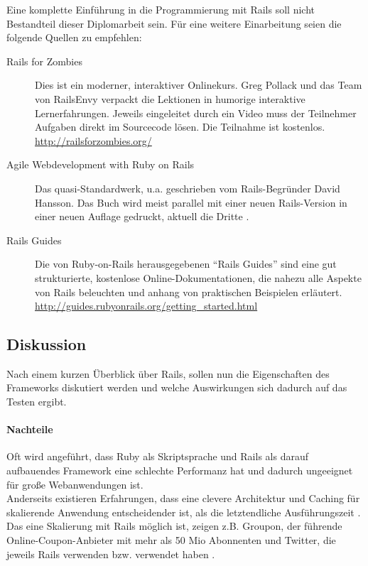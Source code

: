 Eine komplette Einführung in die Programmierung mit Rails soll nicht Bestandteil dieser Diplomarbeit sein. Für eine weitere Einarbeitung seien die folgende Quellen zu empfehlen:
\begin{description}
 \item[Rails for Zombies] Dies ist ein moderner, interaktiver Onlinekurs. Greg Pollack und das Team von RailsEnvy verpackt die Lektionen in humorige interaktive Lernerfahrungen. Jeweils eingeleitet durch ein Video muss der Teilnehmer Aufgaben direkt im Sourcecode lösen. Die Teilnahme ist kostenlos.\\
 \url{http://railsforzombies.org/}
 \item[Agile Webdevelopment with Ruby on Rails] Das quasi-Standardwerk, u.a. geschrieben vom Rails-Begründer David Hansson. Das Buch wird meist parallel mit einer neuen Rails-Version in einer neuen Auflage gedruckt, aktuell die Dritte \citep{ruby_agile_2009}.
 \item[Rails Guides] Die von Ruby-on-Rails herausgegebenen "`Rails Guides"' sind eine gut strukturierte, kostenlose Online-Dokumentationen, die nahezu alle Aspekte von Rails beleuchten und anhang von praktischen Beispielen erläutert.\\
 \url{http://guides.rubyonrails.org/getting_started.html}
 \end{description}



\subsection{Diskussion}
Nach einem kurzen Überblick über Rails, sollen nun die Eigenschaften des Frameworks diskutiert werden und welche Auswirkungen sich dadurch auf das Testen ergibt.

\paragraph{Nachteile}

Oft wird angeführt, dass Ruby als Skriptsprache und Rails als darauf aufbauendes Framework eine schlechte Performanz hat und dadurch ungeeignet für große Webanwendungen ist.\\
Anderseits existieren Erfahrungen, dass eine clevere Architektur und Caching für skalierende Anwendung entscheidender ist, als die letztendliche Ausführungszeit \citep{kirk_haines_ruby_2010}.
Das eine Skalierung mit Rails möglich ist, zeigen z.B. Groupon, der führende Online-Coupon-Anbieter mit mehr als 50 Mio Abonnenten und Twitter, die jeweils Rails verwenden bzw. verwendet haben \citep{ruby_on_rails_2011}.

